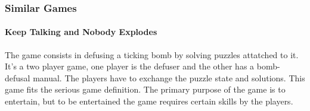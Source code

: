 \documentclass[12pt]{article}
\begin{document}
\subsubsection{Similar Games}
\paragraph{Keep Talking and Nobody Explodes} \cite{ktne}
The game consists in defusing a ticking bomb by solving puzzles attatched to it. It's a two player game, one player is the defuser and the other has a bomb-defusal manual. The players have to exchange the puzzle state and solutions. This game fits the serious game definition. The primary purpose of the game is to entertain, but to be entertained the game requires certain skills by the players. 

\vspace{0.4cm}

\vfill
{}
\end{document}
